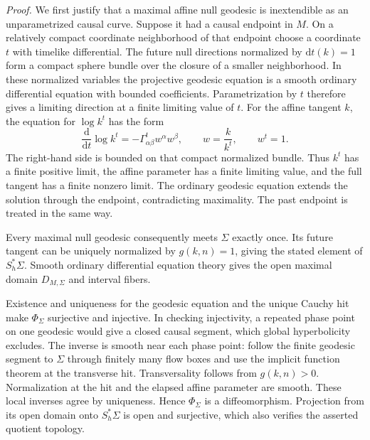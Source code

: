 \documentclass[
  english,
  11pt,
  reqno]{amsart}
\begin{document}
\emph{Proof.} We first justify that a maximal affine null geodesic is
inextendible as an unparametrized causal curve. Suppose it had a causal
endpoint in \(M\). On a relatively compact coordinate neighborhood of
that endpoint choose a coordinate \(t\) with timelike differential. The
future null directions normalized by \(\mathrm dt(k)=1\) form a compact
sphere bundle over the closure of a smaller neighborhood. In these
normalized variables the projective geodesic equation is a smooth
ordinary differential equation with bounded coefficients.
Parametrization by \(t\) therefore gives a limiting direction at a
finite limiting value of \(t\). For the affine tangent \(k\), the
equation for \(\log k^t\) has the form \[
\frac{\mathrm d}{\mathrm dt}\log k^t
=-\Gamma^t_{\alpha\beta}w^\alpha w^\beta,
\qquad w=\frac{k}{k^t},\qquad w^t=1.
\] The right-hand side is bounded on that compact normalized bundle.
Thus \(k^t\) has a finite positive limit, the affine parameter has a
finite limiting value, and the full tangent has a finite nonzero limit.
The ordinary geodesic equation extends the solution through the
endpoint, contradicting maximality. The past endpoint is treated in the
same way.

Every maximal null geodesic consequently meets \(\Sigma\) exactly once.
Its future tangent can be uniquely normalized by \(g(k,n)=1\), giving
the stated element of \(S_h^*\Sigma\). Smooth ordinary differential
equation theory gives the open maximal domain \(D_{M,\Sigma}\) and
interval fibers.

Existence and uniqueness for the geodesic equation and the unique Cauchy
hit make \(\Phi_\Sigma\) surjective and injective. In checking
injectivity, a repeated phase point on one geodesic would give a closed
causal segment, which global hyperbolicity excludes. The inverse is
smooth near each phase point: follow the finite geodesic segment to
\(\Sigma\) through finitely many flow boxes and use the implicit
function theorem at the transverse hit. Transversality follows from
\(g(k,n)>0\). Normalization at the hit and the elapsed affine parameter
are smooth. These local inverses agree by uniqueness. Hence
\(\Phi_\Sigma\) is a diffeomorphism. Projection from its open domain
onto \(S_h^*\Sigma\) is open and surjective, which also verifies the
asserted quotient topology.
\end{document}

